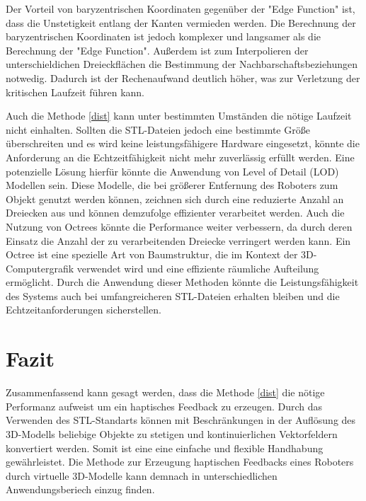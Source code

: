\documentclass[conference]{IEEEtran}
\begin{document}
Der Vorteil von baryzentrischen Koordinaten gegenüber der "Edge Function" ist, dass die Unstetigkeit 
entlang der Kanten vermieden werden. Die Berechnung der baryzentrischen Koordinaten ist jedoch komplexer und 
langsamer als die Berechnung der "Edge Function". Außerdem ist zum Interpolieren der unterschieldichen Dreieckflächen die 
Bestimmung der Nachbarschaftsbeziehungen notwedig. Dadurch ist der Rechenaufwand deutlich höher, was zur Verletzung 
der kritischen Laufzeit führen kann.

Auch die Methode \ref*{dist} kann unter bestimmten Umständen die nötige Laufzeit nicht einhalten. 
Sollten die STL-Dateien jedoch eine bestimmte Größe überschreiten und es wird keine leistungsfähigere 
Hardware eingesetzt, könnte die Anforderung an die Echtzeitfähigkeit nicht mehr zuverlässig erfüllt werden. 
Eine potenzielle Lösung hierfür könnte die Anwendung von Level of Detail (LOD) Modellen sein. 
Diese Modelle, die bei größerer Entfernung des Roboters zum Objekt genutzt werden können, zeichnen 
sich durch eine reduzierte Anzahl an Dreiecken aus und können demzufolge effizienter verarbeitet werden. 
Auch die Nutzung von Octrees könnte die Performance weiter verbessern, da durch deren Einsatz die Anzahl 
der zu verarbeitenden Dreiecke verringert werden kann. Ein Octree ist eine spezielle Art von Baumstruktur, 
die im Kontext der 3D-Computergrafik verwendet wird und eine effiziente räumliche Aufteilung ermöglicht. 
Durch die Anwendung dieser Methoden könnte die Leistungsfähigkeit des Systems auch bei umfangreicheren 
STL-Dateien erhalten bleiben und die Echtzeitanforderungen sicherstellen.

\section{Fazit}

Zusammenfassend kann gesagt werden, dass die Methode \ref*{dist} die nötige Performanz aufweist um ein 
haptisches Feedback zu erzeugen. Durch das Verwenden des STL-Standarts können mit Beschränkungen in der Auflösung des 
3D-Modells beliebige Objekte zu stetigen und kontinuierlichen Vektorfeldern konvertiert werden. Somit ist eine eine einfache und 
flexible Handhabung gewährleistet. Die Methode zur Erzeugung haptischen Feedbacks eines Roboters durch virtuelle 3D-Modelle 
kann demnach in unterschiedlichen Anwendungsberiech einzug finden.  

\printbibliography
\end{document}
